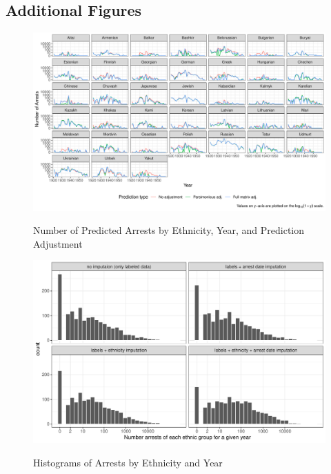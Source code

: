 \subsection*{Additional Figures}

\begin{figure}[H]
\centering
\caption{Number of Predicted Arrests by Ethnicity, Year, and Prediction Adjustment}
\includegraphics[width=1.2\textwidth]{plots/arrests/prediction_type_by_year.pdf}
\label{fig:prediction_type_by_year}
\end{figure}

\begin{figure}[H]
\centering
\caption{Histograms of Arrests by Ethnicity and Year}
\includegraphics[width=1.2\textwidth]{plots/arrests/facet_hist.pdf}
\label{fig:facet_by_year}
\end{figure}

